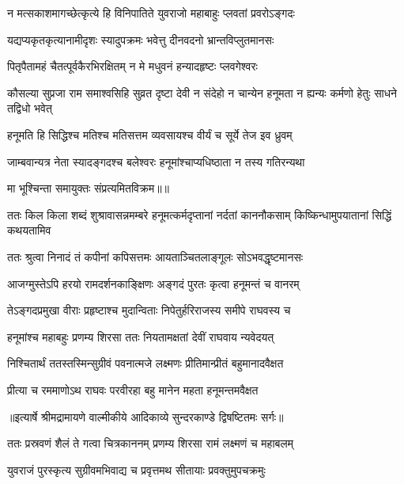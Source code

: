 \twolineshloka
{न मत्सकाशमागच्छेत्कृत्ये हि विनिपातिते}
{युवराजो महाबाहुः प्लवतां प्रवरोऽङ्गदः} %

\twolineshloka
{यद्यप्यकृतकृत्यानामीदृशः स्यादुपक्रमः}
{भवेत्तु दीनवदनो भ्रान्तविप्लुतमानसः} %

\twolineshloka
{पितृपैतामहं चैतत्पूर्वकैरभिरक्षितम्}
{न मे मधुवनं हन्यादहृष्टः प्लवगेश्वरः} %

\threelineshloka
{कौसल्या सुप्रजा राम समाश्वसिहि सुव्रत}
{दृष्टा देवी न संदेहो न चान्येन हनूमता}
{न ह्यन्यः कर्मणो हेतुः साधने तद्विधो भवेत्} %

\twolineshloka
{हनूमति हि सिद्धिश्च मतिश्च मतिसत्तम}
{व्यवसायश्च वीर्यं च सूर्ये तेज इव ध्रुवम्} %

\twolineshloka
{जाम्बवान्यत्र नेता स्यादङ्गदश्च बलेश्वरः}
{हनूमांश्चाप्यधिष्ठाता न तस्य गतिरन्यथा} %

{मा भूश्चिन्ता समायुक्तः संप्रत्यमितविक्रम॥॥} %

\addtocounter{shlokacount}{1}

\threelineshloka
{ततः किल किला शब्दं शुश्रावासन्नमम्बरे}
{हनूमत्कर्मदृप्तानां नर्दतां काननौकसाम्}
{किष्किन्धामुपयातानां सिद्धिं कथयतामिव} %

\twolineshloka
{ततः श्रुत्वा निनादं तं कपीनां कपिसत्तमः}
{आयताञ्चितलाङ्गूलः सोऽभवद्धृष्टमानसः} %

\twolineshloka
{आजग्मुस्तेऽपि हरयो रामदर्शनकाङ्क्षिणः}
{अङ्गदं पुरतः कृत्वा हनूमन्तं च वानरम्} %

\twolineshloka
{तेऽङ्गदप्रमुखा वीराः प्रहृष्टाश्च मुदान्विताः}
{निपेतुर्हरिराजस्य समीपे राघवस्य च} %

\twolineshloka
{हनूमांश्च महाबहुः प्रणम्य शिरसा ततः}
{नियतामक्षतां देवीं राघवाय न्यवेदयत्} %

\twolineshloka
{निश्चितार्थं ततस्तस्मिन्सुग्रीवं पवनात्मजे}
{लक्ष्मणः प्रीतिमान्प्रीतं बहुमानादवैक्षत} %

\twolineshloka
{प्रीत्या च रममाणोऽथ राघवः परवीरहा}
{बहु मानेन महता हनूमन्तमवैक्षत} %


{॥इत्यार्षे श्रीमद्रामायणे वाल्मीकीये आदिकाव्ये सुन्दरकाण्डे द्विषष्टितमः सर्गः॥}


\twolineshloka
{ततः प्रस्रवणं शैलं ते गत्वा चित्रकाननम्}
{प्रणम्य शिरसा रामं लक्ष्मणं च महाबलम्} %

\twolineshloka
{युवराजं पुरस्कृत्य सुग्रीवमभिवाद्य च}
{प्रवृत्तमथ सीतायाः प्रवक्तुमुपचक्रमुः} %

